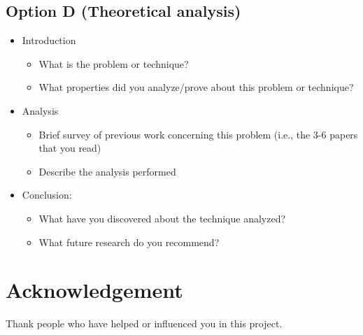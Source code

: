 \documentclass{article}
\begin{document}
\subsection*{Option D (Theoretical analysis)}
\begin{itemize}
\item Introduction
	\begin{itemize}
	\item What is the problem or technique?
	\item What properties did you analyze/prove about this problem or technique?
	\end{itemize}
\item Analysis
	\begin{itemize}
	\item Brief survey of previous work concerning this problem (i.e., the 3-6 papers that you read)
	\item Describe the analysis performed
	\end{itemize}
\item Conclusion:
	\begin{itemize}
	\item What have you discovered about the technique analyzed?
	\item What future research do you recommend?
	\end{itemize}
\end{itemize}

\newpage

\section*{Acknowledgement}
Thank people who have helped or influenced you in this project.

\nocite{*}



\end{document}

